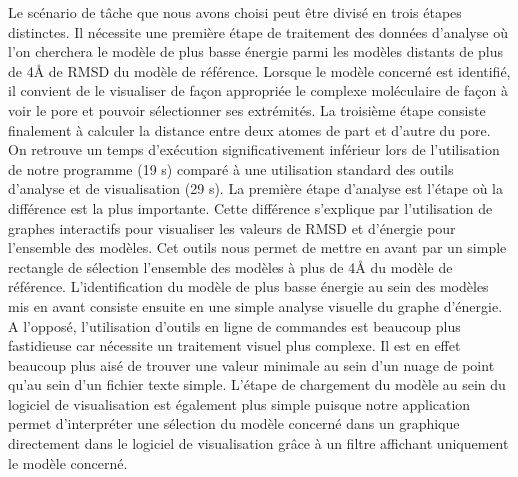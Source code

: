 Le scénario de tâche que nous avons choisi peut être divisé en trois étapes distinctes. Il nécessite une première étape de traitement des données d'analyse où l'on cherchera le modèle de plus basse énergie parmi les modèles distants de plus de 4\r{A} de RMSD du modèle de référence. Lorsque le modèle concerné est identifié, il convient de le visualiser de façon appropriée le complexe moléculaire de façon à voir le pore et pouvoir sélectionner ses extrémités. La troisième étape consiste finalement à calculer la distance entre deux atomes de part et d'autre du pore.
On retrouve un temps d'exécution significativement inférieur lors de l'utilisation de notre programme (19 s) comparé à une utilisation standard des outils d'analyse et de visualisation (29 s). La première étape d'analyse est l'étape où la différence est la plus importante. Cette différence s'explique par l'utilisation de graphes interactifs pour visualiser les valeurs de RMSD et d'énergie pour l'ensemble des modèles. Cet outils nous permet de mettre en avant par un simple rectangle de sélection l'ensemble des modèles à plus de 4\r{A} du modèle de référence. L'identification du modèle de plus basse énergie au sein des modèles mis en avant consiste ensuite en une simple analyse visuelle du graphe d'énergie.
A l'opposé, l'utilisation d'outils en ligne de commandes est beaucoup plus fastidieuse car nécessite un traitement visuel plus complexe. Il est en effet beaucoup plus aisé de trouver une valeur minimale au sein d'un nuage de point qu'au sein d'un fichier texte simple. L'étape de chargement du modèle au sein du logiciel de visualisation est également plus simple puisque notre application permet d'interpréter une sélection du modèle concerné dans un graphique directement dans le logiciel de visualisation grâce à un filtre affichant uniquement le modèle concerné.

